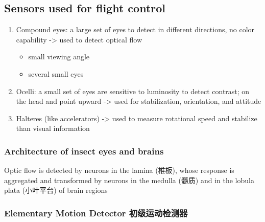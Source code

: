 \documentclass[]{article}
\begin{document}
\subsection{Sensors used for flight control}\label{header-n2381}

\begin{enumerate}
\def\labelenumi{\arabic{enumi}.}
\item
  Compound eyes: a large set of eyes to detect in different directions,
  no color capability -\textgreater{} used to detect optical flow

  \begin{itemize}
  \item
    small viewing angle
  \item
    several small eyes
  \end{itemize}
\item
  Ocelli: a small set of eyes are sensitive to luminosity to detect
  contrast; on the head and point upward -\textgreater{} used for
  stabilization, orientation, and attitude
\item
  Halteres (like accelerators) -\textgreater{} used to measure
  rotational speed and stabilize than visual information
\end{enumerate}

\subsubsection{Architecture of insect eyes and
brains}\label{header-n2394}

Optic flow is detected by neurons in the lamina (椎板), whose response
is aggregated and transformed by neurons in the medulla (髓质) and in
the lobula plata (小叶平台) of brain regions

\subsubsection{Elementary Motion Detector
初级运动检测器}\label{header-n2396}
\end{document}
